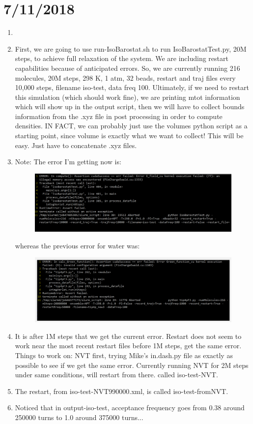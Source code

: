 \documentclass[12pt,reqno]{amsart}
\numberwithin{equation}{section}
\begin{document}
\section{7/11/2018}
\begin{enumerate}
\item 
\item First, we are going to use run-IsoBarostat.sh to run IsoBarostatTest.py, 20M steps, to achieve full relaxation of the system.  We are including restart capabilities because of anticipated errors.  So, we are currently running 216 molecules, 20M steps, 298 K, 1 atm, 32 beads, restart and traj files every 10,000 steps, filename iso-test, data freq 100.  Ultimately, if we need to restart this simulation (which should work fine), we are printing mtot information which will show up in the output script, then we will have to collect bounds information from the .xyz file in post processing in order to compute densities.  IN FACT, we can probably just use the volumes python script as a starting point, since volume is exactly what we want to collect!  This will be easy.  Just have to concatenate .xyz files. 
\item Note: The error I'm getting now is:
\begin{figure}[H]
\centering
\includegraphics[scale=0.6]{current-error}
\end{figure}
whereas the previous error for water was:
\begin{figure}[H]
\centering
\includegraphics[scale=0.6]{previous-error}
\end{figure}
\item It is after 1M steps that we get the current error.  Restart does not seem to work near the most recent restart files before 1M steps, get the same error.  Things to work on: NVT first, trying Mike's in.dash.py file as exactly as possible to see if we get the same error.  Currently running NVT for 2M steps under same conditions, will restart from there.  called iso-test-NVT.  
\item The restart, from iso-test-NVT\-990000.xml, is called iso-test-fromNVT.  
\item Noticed that in output-iso-test, acceptance frequency goes from 0.38 around 250000 turns to 1.0 around 375000 turns...
\end{enumerate}
\end{document}
